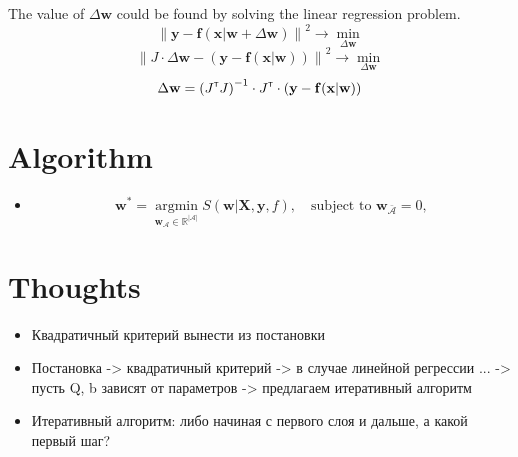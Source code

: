 \documentclass[a4paper,12pt]{article}
\theoremstyle{plain} %
\theoremstyle{definition} %
\theoremstyle{remark} %
\newcommand{\bw}{\mathbf{w}}
\newcommand{\by}{\mathbf{y}}
\newcommand{\bx}{\mathbf{x}}
\newcommand{\bX}{\mathbf{X}}
\newcommand{\cA}{\mathcal{A}}
\newcommand{\bbR}{\mathbb{R}}
\newcommand{\T}{{\text{\tiny\sffamily\upshape\mdseries T}}}
\newcommand{\argmin}{\mathop{\arg \min}\limits}
\begin{document}
	The value of $\Delta \bw$ could be found by solving the linear regression problem.
	\begin{equation}
		\left\| \by - \mathbf{f} (\bx | \bw + \Delta \bw) \right\| ^2 \rightarrow \min_{\Delta \bw}
	\end{equation}
	\begin{equation}
		\left\| J \cdot \Delta \bw - \left( \by - \mathbf{f} (\bx | \bw) \right) \right\|^2 \rightarrow \min_{\Delta \bw}
	\end{equation}
	\begin{equation}
		\Delta \bw = \left( J^{\T} J \right)^{-1} \cdot J^{\T} \cdot \left( \by - \mathbf{f} (\bx | \bw) \right)
	\end{equation}
	
	
	\section{Algorithm}
	\begin{itemize}
		\item \begin{equation}
		\bw^* = \argmin_{\bw_{\cA} \in \bbR^{|\cA|}} S(\bw | \bX, \by, f), \quad \text{subject to } \bw_{\bar{\cA}} = 0,
		\label{eq:reduced_error_function}
		\end{equation}
	\end{itemize}

	\section{Thoughts}
	\begin{itemize}
		\item Квадратичный критерий вынести из постановки
		\item Постановка -> квадратичный критерий -> в случае линейной регрессии ... -> пусть Q, b зависят от параметров -> предлагаем итеративный алгоритм 
		\item Итеративный алгоритм: либо начиная с первого слоя и дальше, а какой первый шаг?
	\end{itemize}
	
	
\end{document}

